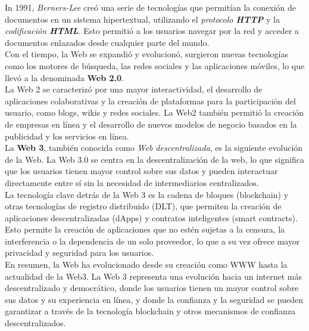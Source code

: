 \hfill \break
In 1991, \textit{Berners-Lee} creó una serie de tecnologías que permitían la 
conexión de documentos en un sistema hipertextual, utilizando el 
\textit{protocolo \textbf{HTTP}} y la \textit{codificación \textbf{HTML}}. 
Esto permitió a los usuarios navegar por la red y acceder a documentos 
enlazados desde cualquier parte del mundo. \\
\hfill \break
Con el tiempo, la Web se expandió y evolucionó, surgieron nuevas tecnologías como los 
motores de búsqueda, las redes sociales y las aplicaciones móviles, lo que llevó
a la denominada \textbf{Web 2.0}.\\
\hfill \break
La Web 2 se caracterizó por una mayor interactividad, el desarrollo de 
aplicaciones colaborativas y la creación de plataformas para la participación 
del usuario, como blogs, wikis y redes sociales. La Web2 también permitió la 
creación de empresas en línea y el desarrollo de nuevos modelos de negocio basados 
en la publicidad y los servicios en línea.\cite{web2Explained}\\
\hfill \break
La \textbf{Web 3}, también conocida como \textit{Web descentralizada}, 
es la siguiente evolución de la Web. La Web 3.0 se centra en la descentralización 
de la web, lo que significa que los usuarios tienen mayor control sobre sus 
datos y pueden interactuar directamente entre sí sin la necesidad de 
intermediarios centralizados.\\
\hfill \break
La tecnología clave detrás de la Web 3 es la cadena de bloques (blockchain) y 
otras tecnologías de registro distribuido (DLT), que permiten la creación de 
aplicaciones descentralizadas (dApps) y contratos inteligentes (smart contracts). 
Esto permite la creación de aplicaciones que no estén sujetas a la censura, la 
interferencia o la dependencia de un solo proveedor, lo que a su vez ofrece 
mayor privacidad y seguridad para los usuarios.\\
\hfill \break
En resumen, la Web ha evolucionado desde su creación como WWW hasta la 
actualidad de la Web3. La Web 3 representa una evolución hacia un internet 
más descentralizado y democrático, donde los usuarios tienen un mayor control 
sobre sus datos y su experiencia en línea, y donde la confianza y la seguridad 
se pueden garantizar a través de la tecnología blockchain y otros mecanismos 
de confianza descentralizados.\cite{IEEEweb3Explained}\\